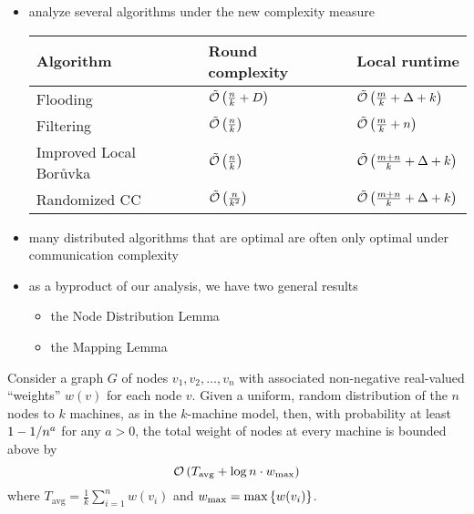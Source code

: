 \begin{frame}
    \begin{itemize}
        \item analyze several algorithms under the new complexity measure
              \begin{tabular}{@{}lll@{}}\toprule
                  Algorithm                  & Round complexity          & Local runtime                        \\\midrule
                  Flooding                   & $\tilde{\mathcal{O}}\left(\frac{n}{k} + D\right)$ & $\tilde{\mathcal{O}}\left(\frac{m}{k} + \Delta + k\right)$   \\
                  Filtering                  & $\tilde{\mathcal{O}}\left(\frac{n}{k}\right)$     & $\tilde{\mathcal{O}}\left(\frac{m}{k} + n\right)$            \\
                  Improved Local Bor\r{u}vka & $\tilde{\mathcal{O}}\left(\frac{n}{k}\right)$     & $\tilde{\mathcal{O}}\left(\frac{m+n}{k} + \Delta + k\right)$ \\
                  Randomized CC              & $\tilde{\mathcal{O}}\left(\frac{n}{k^2}\right)$   & $\tilde{\mathcal{O}}\left(\frac{m+n}{k} + \Delta + k\right)$
              \end{tabular}
        \item many distributed algorithms that are optimal are often only optimal under \alert{communication complexity}
        \item as a byproduct of our analysis, we have two general results
              \begin{itemize}
                  \item the Node Distribution Lemma
                  \item the Mapping Lemma
              \end{itemize}
    \end{itemize}
\end{frame}

\begin{frame}
    \begin{lemma}
        Consider a graph $G$ of nodes $v_1, v_2, \hdots, v_n$ with associated
        non-negative real-valued ``weights'' $w(v)$ for each node $v$. Given a
        uniform, random distribution of the $n$ nodes to $k$ machines, as in the
        $k$-machine model, then, with probability at least $1 - 1 / n^a$ for any
        $a > 0$, the total weight of nodes at every machine is bounded above by
        \[\mathcal{O}\left(T_{\text{avg}}+\log{n}\cdot w_{\text{max}}\right)\]
        where $T_{\text{avg}}=\frac{1}{k}\sum_{i=1}^n w(v_i)$ and
        $w_{\text{max}} = \text{max}\left\{w(v_i)\right\}$.
    \end{lemma}
\end{frame}

